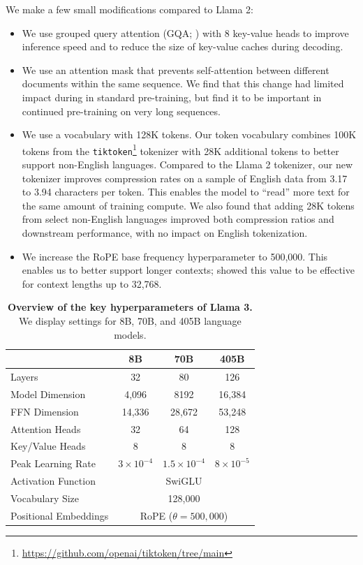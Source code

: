 \documentclass[dvipsnames]{fairmeta}
\begin{document}
We make a few small modifications compared to Llama 2:
\begin{itemize}
    \item We use grouped query attention (GQA; \citet{ainslie2023gqa}) with 8 key-value heads to improve inference speed and to reduce the size of key-value caches during decoding.
    \item We use an attention mask that prevents self-attention between different documents within the same sequence.
    We find that this change had limited impact during in standard pre-training, but find it to be important in continued pre-training on very long sequences.
    \item We use a vocabulary with 128K tokens. Our token vocabulary combines 100K tokens from the \texttt{tiktoken}\footnote{\url{https://github.com/openai/tiktoken/tree/main}} tokenizer with 28K additional tokens to better support non-English languages. Compared to the Llama 2 tokenizer, our new tokenizer improves compression rates on a sample of English data from 3.17 to 3.94 characters per token. This enables the model to ``read'' more text for the same amount of training compute. We also found that adding 28K tokens from select non-English languages improved both compression ratios and downstream performance, with no impact on English tokenization.
    \item We increase the RoPE base frequency hyperparameter to 500,000. This enables us to better support longer contexts; \citet{xiong2023effective} showed this value to be effective for context lengths up to 32,768.
\end{itemize}

\begin{table}[]
	\centering
	\begin{tabular}{l|ccc}
	\toprule
	                      & \textbf{8B}  & \textbf{70B}  & \textbf{405B}\\
	\midrule
	Layers       & 32           & 80            & 126         \\
	Model Dimension   & 4,096         & 8192          & 16,384       \\
	FFN Dimension        &     14,336         &      28,672         &    53,248      \\
	Attention Heads    & 32           & 64            & 128         \\
	Key/Value Heads       & 8            & 8             & 8           \\
	Peak Learning Rate    & $3 \times 10^{-4}$         & $1.5  \times 10^{-4}$       & $8 \times 10^{-5}$        \\
	Activation Function   & \multicolumn{3}{c}{SwiGLU}                 \\
	Vocabulary Size       & \multicolumn{3}{c}{128,000}                   \\
	Positional Embeddings & \multicolumn{3}{c}{RoPE ($\theta=500,000$)} \\
	\bottomrule
	\end{tabular}
	\caption{\textbf{Overview of the key hyperparameters of Llama 3.} We display settings for 8B, 70B, and 405B language models.}
	\label{table:overview_model_hyperparams}
\end{table}
\end{document}

